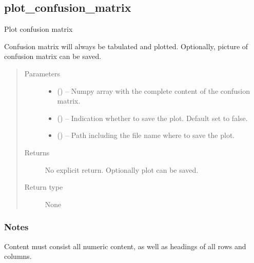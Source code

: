 \documentclass[a4paper,10pt,english]{sphinxmanual}
\begin{document}
\subsection{plot\_confusion\_matrix}
\label{\detokenize{api/ucf.plot_confusion_matrix:plot-confusion-matrix}}\label{\detokenize{api/ucf.plot_confusion_matrix::doc}}

\begin{fulllineitems}
\label{\detokenize{api/ucf.plot_confusion_matrix:ucf.plot_confusion_matrix}}
Plot confusion matrix

Confusion matrix will always be tabulated and plotted. Optionally,
picture of confusion matrix can be saved.
\begin{quote}\begin{description}
\item[{Parameters}] \leavevmode\begin{itemize}
\item {} 
 () -- Numpy array with the complete content of the confusion matrix.

\item {} 
 () -- Indication whether to save the plot. Default set to false.

\item {} 
 () -- Path including the file name where to save the plot.

\end{itemize}

\item[{Returns}] \leavevmode
No explicit return. Optionally plot can be saved.

\item[{Return type}] \leavevmode
None

\end{description}\end{quote}
\subsubsection*{Notes}

Content must consist all numeric content, as well as headings of
all rows and columns.

\end{fulllineitems}
\end{document}
